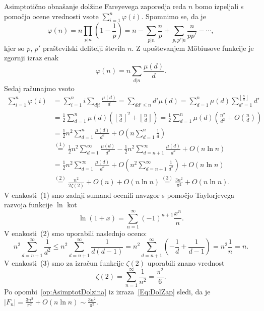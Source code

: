 \documentclass[mat1]{fmfdelo}
\begin{document}
\begin{dokaz}
Asimptotično obnašanje dolžine Fareyevega zaporedja reda $n$ bomo izpeljali s pomočjo ocene vrednosti vsote \( \sum_{i=1}^n \varphi(i) \).
Spomnimo se, da je 
\[ \varphi(n) = n \prod_{p|n} \left (1 - \frac{1}{p} \right ) = n - \sum_{p|n} \frac{n}{p} + \sum_{p,p'|n} \frac{n}{pp'} - \cdots , \]
kjer so $p$, $p'$ praštevilski delitelji števila $n$.  Z upoštevanjem M\"obiusove funkcije je zgornji izraz enak
\[ \varphi(n) = n \sum_{d|n} \frac{\mu(d)}{d} .\]
Sedaj računajmo vsoto 
%
\begin{align}
\label{Eq:DolZap}
\sum_{i=1}^n \varphi(i)
  &= \sum_{i=1}^n i \sum_{d|i} \frac{\mu(d)}{d} = \sum_{dd'\leq n}d' \mu(d) = 
    \sum_{d=1}^n \mu(d) \sum_{d'=1}^{\left \lfloor \frac{n}{d} \right \rfloor} d' \nonumber \\
  &= \frac{1}{2} \sum_{d=1}^{n} \mu(d) \left (\left \lfloor \frac{n}{d} \right \rfloor ^2 + \left \lfloor \frac{n}{d} \right \rfloor \right) =
    \frac{1}{2} \sum_{d=1}^{n} \mu(d) \left (\frac{n^2}{d^2} + O \left (\frac{n}{d} \right) \right) \nonumber \\
  &= \frac{1}{2}n^2 \sum_{d=1}^{n} \frac{\mu(d)}{d^2} + O \left (n \sum_{d=1}^{n} \frac{1}{d} \right ) \nonumber \\
  &\stackrel{(1)}{=} \frac{1}{2}n^2 \sum_{d=1}^{\infty} \frac{\mu(d)}{d^2} - \frac{1}{2}n^2 \sum_{d=n+1}^{\infty} \frac{\mu(d)}{d^2} + O(n \ln{n}) \nonumber \\
  &= \frac{1}{2}n^2 \sum_{d=1}^{\infty} \frac{\mu(d)}{d^2} + O \left (n^2\sum_{d=n+1}^{\infty} \frac{1}{d^2} \right ) + O(n \ln{n}) \nonumber \\
  & \stackrel{(2)}{=} \frac{n^2}{2 \zeta(2)} + O(n) + O(n \ln{n}) \stackrel{(3)}{=} \frac{3n^2}{\pi^2} + O(n \ln{n}).
\end{align}
%
V enakosti~(1) smo zadnji sumand ocenili navzgor s pomočjo Taylorjevega razvoja funkcije $\ln$ kot
\[ \ln{(1+x)} = \sum_{n=1}^{\infty} (-1)^{n+1} \frac{x^n}{n}.\]
%
V enakosti~(2) smo uporabili naslednjo oceno:
\[ n^2 \sum_{d=n+1}^{\infty} \frac{1}{d^2} \leq n^2 \sum_{d=n+1}^{\infty} \frac{1}{d(d-1)} = 
n^2 \sum_{d=n+1}^{\infty} \left (- \frac{1}{d} + \frac{1}{d-1} \right ) = n^2 \frac{1}{n} = n.\]
%
V enakosti~(3) smo za izračun funkcije $\zeta(2)$ uporabili znano vrednost
\[ \zeta(2) = \sum_{n=1}^{\infty} \frac{1}{n^2} = \frac{\pi^2}{6}.\]
%
Po opombi~\ref{op:AsimptotDolzina} iz izraza~\eqref{Eq:DolZap} sledi, da je \(|F_n| = \frac{3n^2}{\pi^2} + O(n \ln{n}) \sim\frac{3n^2}{\pi^2}. \)
\end{dokaz}
\end{document}

